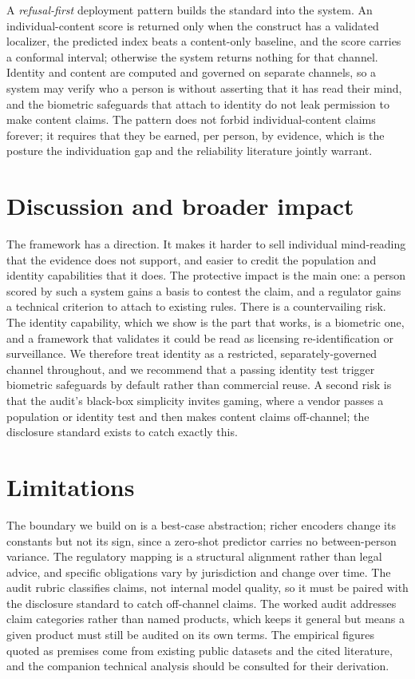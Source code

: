 \documentclass[sigconf,review,anonymous]{acmart}
\begin{document}
A \emph{refusal-first} deployment pattern builds the standard into the system. An individual-content score is
returned only when the construct has a validated localizer, the predicted index beats a content-only
baseline, and the score carries a conformal interval; otherwise the system returns nothing for that channel.
Identity and content are computed and governed on separate channels, so a system may verify who a person is
without asserting that it has read their mind, and the biometric safeguards that attach to identity do not
leak permission to make content claims. The pattern does not forbid individual-content claims forever; it
requires that they be earned, per person, by evidence, which is the posture the individuation gap and the
reliability literature jointly warrant.

\section{Discussion and broader impact}
The framework has a direction. It makes it harder to sell individual mind-reading that the evidence does not
support, and easier to credit the population and identity capabilities that it does. The protective impact is
the main one: a person scored by such a system gains a basis to contest the claim, and a regulator gains a
technical criterion to attach to existing rules. There is a countervailing risk. The identity capability,
which we show is the part that works, is a biometric one, and a framework that validates it could be read as
licensing re-identification or surveillance. We therefore treat identity as a restricted, separately-governed
channel throughout, and we recommend that a passing identity test trigger biometric safeguards by default
rather than commercial reuse. A second risk is that the audit's black-box simplicity invites gaming, where a
vendor passes a population or identity test and then makes content claims off-channel; the disclosure standard
exists to catch exactly this.

\section{Limitations}
The boundary we build on is a best-case abstraction; richer encoders change its constants but not its sign,
since a zero-shot predictor carries no between-person variance. The regulatory mapping is a structural
alignment rather than legal advice, and specific obligations vary by jurisdiction and change over time. The
audit rubric classifies claims, not internal model quality, so it must be paired with the disclosure standard
to catch off-channel claims. The worked audit addresses claim categories rather than named products, which
keeps it general but means a given product must still be audited on its own terms. The empirical figures
quoted as premises come from existing public datasets and the cited literature, and the companion technical
analysis should be consulted for their derivation.
\end{document}
